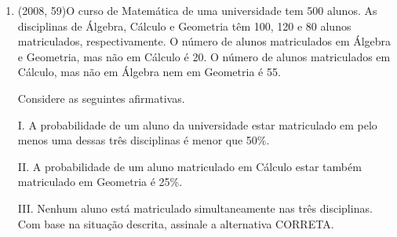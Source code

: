 \documentclass{article}
\begin{document}
\begin{enumerate}
a) 210

b) 2.401

c) 35

d) 70

e) 11\newline
\textbf{RESOLUÇÃO}

$\rule[1cm]{100cm}{1px}$


$C(n,p)\frac{(n+p-1)}{p} = \frac{(7+4-1)}{4} = \frac{10!}{4!} $

$C(n,p)\frac{10.9.8.7.6!}{6!.4!} = \frac{10.9.8.7}{4.3.2} = 210 $ \newline

a) 210\newline


\textbf{CONTEÚDO}

$\rule[1cm]{100cm}{1px}$


(I) para 4 sabores iguais = 7 modos 

(II) para 3 iguais e 1 diferente  7x6 = 42 modos 

(III) para 2 iguais e dois iguais mas diferentes entre si  (7x6)/2 = 21 modos 

(IV)  para 2 iguais e dois diferentes 7x C(6,2) = 105 

(V)  para 4 diferentes  C(7,4) = 35 modos 

Total = (I) +(II) + (III) + (IV) + (V) = 210 

OU 

Combinação com repetição: 

$C(n,p)\frac{(n+p-1)}{p}$



\newpage



\item(2008, 59)O curso de Matemática de uma universidade tem 500 alunos. As disciplinas de Álgebra, Cálculo e Geometria têm 100, 120 e 80 alunos matriculados, respectivamente. O número de alunos matriculados em Álgebra e Geometria, mas não em Cálculo é 20. O número de alunos matriculados em Cálculo, mas não em Álgebra nem em Geometria é 55.

Considere as seguintes afirmativas.

I. A probabilidade de um aluno da universidade estar matriculado em pelo menos uma
dessas três disciplinas é menor que 50\%.

II. A probabilidade de um aluno matriculado em Cálculo estar também matriculado em
Geometria é 25\%.

III. Nenhum aluno está matriculado simultaneamente nas três disciplinas.
Com base na situação descrita, assinale a alternativa CORRETA.


\end{enumerate}
\end{document}

